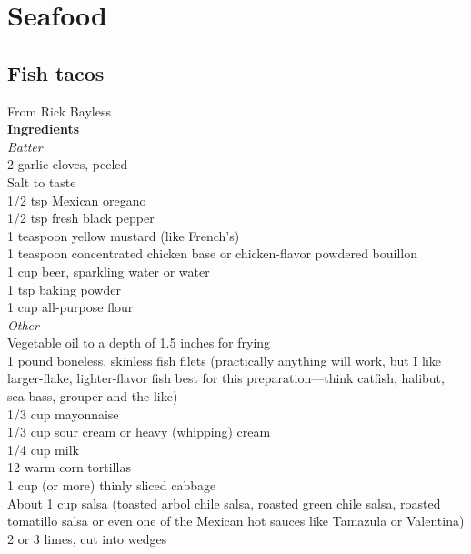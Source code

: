 \documentclass{article}
\numberwithin{figure}{section}
\numberwithin{equation}{section}
\begin{document}
\section{Seafood}

\pagebreak
\subsection{Fish tacos}
From Rick Bayless\\

{\bf Ingredients}\\
{\it Batter}\\
2 garlic cloves, peeled\\
Salt to taste\\
1/2 tsp Mexican oregano\\
1/2 tsp fresh black pepper\\
1 teaspoon yellow mustard (like French's)\\
1 teaspoon concentrated chicken base or chicken-flavor powdered bouillon\\
1 cup beer, sparkling water or water\\
1 tsp baking powder\\
1 cup all-purpose flour\\

{\it Other}\\
Vegetable oil to a depth of 1.5 inches for frying\\
1 pound boneless, skinless fish filets (practically anything will work, but I like larger-flake, lighter-flavor fish best for this preparation—think catfish, halibut, sea bass, grouper and the like)\\
1/3 cup mayonnaise\\
1/3 cup sour cream or heavy (whipping) cream\\
1/4 cup milk\\
12 warm corn tortillas\\
1 cup (or more) thinly sliced cabbage\\
About 1 cup salsa (toasted arbol chile salsa, roasted green chile salsa, roasted tomatillo salsa or even one of the Mexican hot sauces like Tamazula or Valentina)\\
2 or 3 limes, cut into wedges\\
\end{document}
